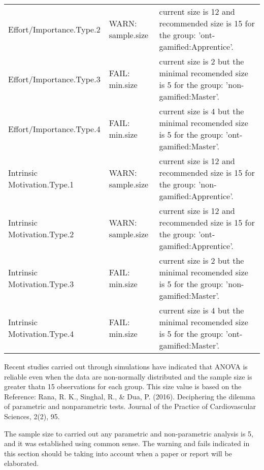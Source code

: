 \documentclass[6pt,a4paper]{article}
\begin{document}
\begin{landscape}
{\begin{longtable}{lll}
Effort/Importance.Type.2&WARN: sample.size&current size is 12 and recommended size is 15 for the group: 'ont-gamified:Apprentice'.\tabularnewline
Effort/Importance.Type.3&FAIL: min.size&current size is 2 but the minimal recomended size is 5 for the group: 'non-gamified:Master'.\tabularnewline
Effort/Importance.Type.4&FAIL: min.size&current size is 4 but the minimal recomended size is 5 for the group: 'ont-gamified:Master'.\tabularnewline
Intrinsic Motivation.Type.1&WARN: sample.size&current size is 12 and recommended size is 15 for the group: 'non-gamified:Apprentice'.\tabularnewline
Intrinsic Motivation.Type.2&WARN: sample.size&current size is 12 and recommended size is 15 for the group: 'ont-gamified:Apprentice'.\tabularnewline
Intrinsic Motivation.Type.3&FAIL: min.size&current size is 2 but the minimal recomended size is 5 for the group: 'non-gamified:Master'.\tabularnewline
Intrinsic Motivation.Type.4&FAIL: min.size&current size is 4 but the minimal recomended size is 5 for the group: 'ont-gamified:Master'.\tabularnewline
\hline
\end{longtable}}

Recent studies carried out through simulations have indicated that ANOVA is reliable even when the data are non-normally distributed and the sample size is greater thatn 15 observations for each group.
This size value is based on the Reference:
Rana, R. K., Singhal, R., \& Dua, P. (2016). Deciphering the dilemma of parametric and nonparametric tests. Journal of the Practice of Cardiovascular Sciences, 2(2), 95.

The sample size to carried out any parametric and non-parametric analysis is 5, and it was established using common sense.
The warning and fails indicated in this section should be taking into account when a paper or report will be elaborated.
\end{landscape}
\end{document}
